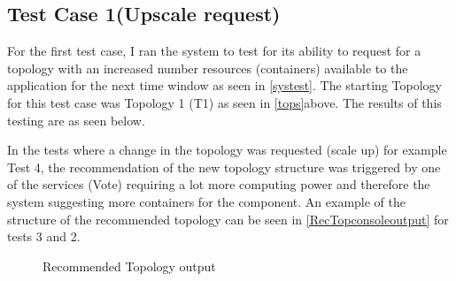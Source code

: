 \subsection{Test Case 1(Upscale request)}
For the first test case, I ran the system to test for its ability to request for a topology with an increased number resources (containers) available to the application for the next time window as seen in \autoref{systest}. The starting Topology for this test case was Topology 1 (T1) as seen in \autoref{tops}above. The results of this testing are as seen below.
\begin{table}[H]
\caption{Test case 1 run on the application.}
\label{systest}
\end{table}

In the tests where a change in the topology was requested (scale up) for example Test 4, the recommendation of the new topology structure was triggered by one of the services (Vote) requiring a lot more computing power and therefore the system suggesting more containers for the component. An example of the structure of the recommended topology can be seen in \autoref{RecTopconsoleoutput} for tests 3 and 2.
\begin{figure} [H]
   \centering 
   \hfill
   \caption{ Recommended Topology output} 
   \label{RecTopconsoleoutput} 
\end{figure}


